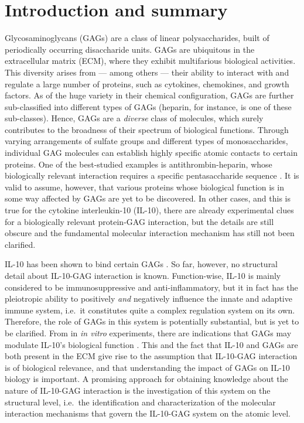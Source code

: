 \chapter{Introduction and summary}



Glycosaminoglycans (GAGs) are a class of linear polysaccharides, built of
periodically occurring disaccharide units. GAGs are ubiquitous in the
extracellular matrix (ECM), where they exhibit multifarious biological
activities. This diversity arises from --- among others --- their ability to
interact with and regulate a large number of proteins, such as cytokines,
chemokines, and growth factors. As of the huge variety in their chemical
configuration, GAGs are further sub-classified into different types of GAGs
(heparin, for instance, is one of these sub-classes). Hence, GAGs are a
\textit{diverse} class of molecules, which surely contributes to the broadness
of their spectrum of biological functions. Through varying arrangements of
sulfate groups and different types of monosaccharides, individual GAG molecules
can establish highly specific atomic contacts to certain proteins. One of the
best-studied examples is antithrombin-heparin, whose biologically relevant
interaction requires a specific pentasaccharide sequence
\cite{antithrombin-thrombin-heparin-2004}. It is valid to assume, however, that
various proteins whose biological function is in some way affected by GAGs are
yet to be discovered. In other cases, and this is true for the cytokine
interleukin-10 (IL-10), there are already experimental clues for a biologically
relevant protein-GAG interaction, but the details are still obscure and the
fundamental molecular interaction mechanism has still not been clarified.

IL-10 has been shown to bind certain GAGs \cite{salek_ardakani_2000}. So far,
however, no structural detail about IL-10-GAG interaction is known.
Function-wise, IL-10 is mainly considered to be immunosuppressive and
anti-inflammatory, but it in fact has the pleiotropic ability to positively
\textit{and} negatively influence the innate and adaptive immune system, i.e.\
it constitutes quite a complex regulation system on its own. Therefore, the role
of GAGs in this system is potentially substantial, but is yet to be clarified.
From in \textit{in vitro} experiments, there are indications that GAGs may
modulate IL-10's biological function \cite{salek_ardakani_2000}. This and the
fact that IL-10 and GAGs are both present in the ECM give rise to the assumption
that IL-10-GAG interaction is of biological relevance, and that understanding
the impact of GAGs on IL-10 biology is important. A promising approach for
obtaining knowledge about the nature of IL-10-GAG interaction is the
investigation of this system on the structural level, i.e.\ the identification
and characterization of the molecular interaction mechanisms that govern the
IL-10-GAG system on the atomic level.

